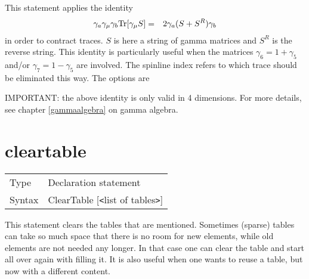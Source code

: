 \noindent This statement applies the identity
\begin{eqnarray}
    \gamma_a\gamma_\mu\gamma_b {\rm Tr}[\gamma_\mu S] & = &
         2\gamma_a( S + S^R ) \gamma_b  \nonumber
\end{eqnarray}
\setcounter{equation}{2}
in order to contract traces. $S$ is here a string of
gamma matrices and $S^R$ is the reverse string. This 
identity is particularly useful when the matrices $\gamma_6 = 1+\gamma_5$ 
and/or $\gamma_7 = 1-\gamma_5$ are involved. The spinline index refers to 
which trace should be eliminated this way. The options are \vspace{1mm}
 


\noindent IMPORTANT: the above identity is only valid in 4 dimensions. For 
more details, see chapter \ref{gammaalgebra} on gamma algebra. \vspace{10mm}


\section{cleartable}
\label{substacleartable}

\noindent \begin{tabular}{ll}
Type & Declaration statement\\
Syntax & ClearTable [{\tt<}list of tables{\tt>}]
\end{tabular} \vspace{4mm}

\noindent This statement clears the tables that are mentioned. Sometimes 
(sparse) tables can take so much space that there is no room for new 
elements, while old elements are not needed any longer. In that case one 
can clear the table and start all over again with filling it. It is also 
useful when one wants to reuse a table, but now with a different content.
\vspace{10mm}

